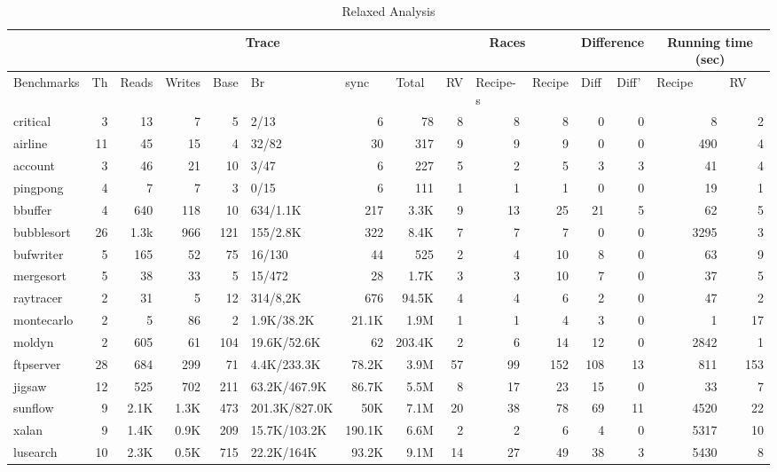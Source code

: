 \begin{table}[htbp]
\caption{Relaxed Analysis}
\begin{tabular}{|l|r|r|r|r|l|r|r|r|r|r|r|r|r|r|}
\hline
 & \multicolumn{ 7}{c|}{Trace} & \multicolumn{ 3}{c|}{Races} & \multicolumn{ 2}{c|}{Difference} & \multicolumn{ 2}{c|}{Running time (sec)} \\ \hline
Benchmarks & \multicolumn{1}{l|}{Th} & \multicolumn{1}{l|}{Reads} & \multicolumn{1}{l|}{Writes} & \multicolumn{1}{l|}{Base} & Br & \multicolumn{1}{l|}{sync} & \multicolumn{1}{l|}{Total} & \multicolumn{1}{l|}{RV} & \multicolumn{1}{l|}{Recipe-s} & \multicolumn{1}{l|}{Recipe} & \multicolumn{1}{l|}{Diff} & \multicolumn{1}{l|}{Diff'} & \multicolumn{1}{l|}{Recipe} & \multicolumn{1}{l|}{RV} \\ \hline
critical & 3 & 13 & 7 & 5 & 2/13 & 6 & 78 & 8 & 8 & 8 & 0 & 0 & 8 & 2 \\ \hline
airline & 11 & 45 & 15 & 4 & 32/82 & 30 & 317 & 9 & 9 & 9 & 0 & 0 & 490 & 4 \\ \hline
account & 3 & 46 & 21 & 10 & 3/47 & 6 & 227 & 5 & 2 & 5 & 3 & 3 & 41 & 4 \\ \hline
pingpong & 4 & 7 & 7 & 3 & 0/15 & 6 & 111 & 1 & 1 & 1 & 0 & 0 & 19 & 1 \\ \hline
bbuffer & 4 & 640 & 118 & 10 & 634/1.1K & 217 & 3.3K & 9 & 13 & 25 & 21 & 5 & 62 & 5 \\ \hline
bubblesort & 26 & 1.3k & 966 & 121 & 155/2.8K & 322 & 8.4K & 7 & 7 & 7 & 0 & 0 & 3295 & 3 \\ \hline
bufwriter & 5 & 165 & 52 & 75 & 16/130 & 44 & 525 & 2 & 4 & 10 & 8 & 0 & 63 & 9 \\ \hline
mergesort & 5 & 38 & 33 & 5 & 15/472 & 28 & 1.7K & 3 & 3 & 10 & 7 & 0 & 37 & 5 \\ \hline
raytracer & 2 & 31 & 5 & 12 & 314/8,2K & 676 & 94.5K & 4 & 4 & 6 & 2 & 0 & 47 & 2 \\ \hline
montecarlo & 2 & 5 & 86 & 2 & 1.9K/38.2K & 21.1K & 1.9M & 1 & 1 & 4 & 3 & 0 & 1 & 17 \\ \hline
moldyn & 2 & 605 & 61 & 104 & 19.6K/52.6K & 62 & 203.4K & 2 & 6 & 14 & 12 & 0 & 2842 & 1 \\ \hline
ftpserver & 28 & 684 & 299 & 71 & 4.4K/233.3K & 78.2K & 3.9M & 57 & 99 & 152 & 108 & 13 & 811 & 153 \\ \hline
jigsaw & 12 & 525 & 702 & 211 & 63.2K/467.9K & 86.7K & 5.5M & 8 & 17 & 23 & 15 & 0 & 33 & 7 \\ \hline
sunflow & 9 & 2.1K & 1.3K & 473 & 201.3K/827.0K & 50K & 7.1M & 20 & 38 & 78 & 69 & 11 & 4520 & 22 \\ \hline
xalan & 9 & 1.4K & 0.9K & 209 & 15.7K/103.2K & 190.1K & 6.6M & 2 & 2 & 6 & 4 & 0 & 5317 & 10 \\ \hline
lusearch & 10 & 2.3K & 0.5K & 715 & 22.2K/164K & 93.2K & 9.1M & 14 & 27 & 49 & 38 & 3 & 5430 & 8 \\ \hline
\end{tabular}
\label{tab:main}
\vspace{-2em}
\end{table}



